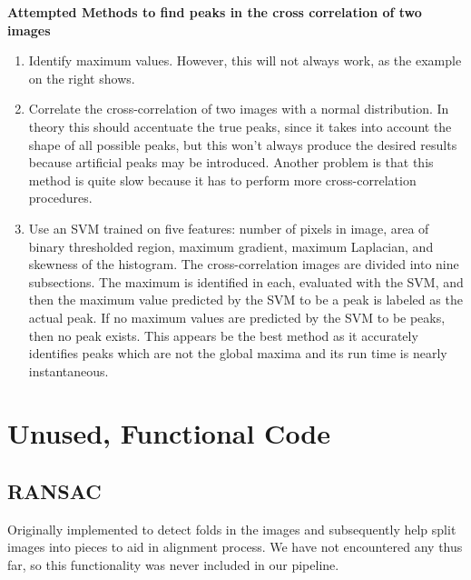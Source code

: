 \documentclass{article}
\begin{document}
\textbf{Attempted Methods to find peaks in the cross correlation of two images}
\begin{enumerate}
\item Identify maximum values. However, this will not always work, as the example on the right shows.
\item Correlate the cross-correlation of two images with a normal distribution. In theory this should accentuate the true peaks, since it takes into account the shape of all possible peaks, but this won't always produce the desired results because artificial peaks may be introduced. Another problem is that this method is quite slow because it has to perform more cross-correlation procedures. 
\item Use an SVM trained on five features: number of pixels in image, area of binary thresholded region, maximum gradient, maximum Laplacian, and skewness of the histogram. The cross-correlation images are divided into nine subsections. The maximum is identified in each, evaluated with the SVM, and then the maximum value predicted by the SVM to be a peak is labeled as the actual peak. If no maximum values are predicted by the SVM to be peaks, then no peak exists. This appears be the best method as it accurately identifies peaks which are not the global maxima and its run time is nearly instantaneous. 
\end{enumerate}

\section{Unused, Functional Code}
\subsection{RANSAC}
Originally implemented to detect folds in the images and subsequently help split images into pieces to aid in alignment process. We have not encountered any thus far, so this functionality was never included in our pipeline.
\end{document}
